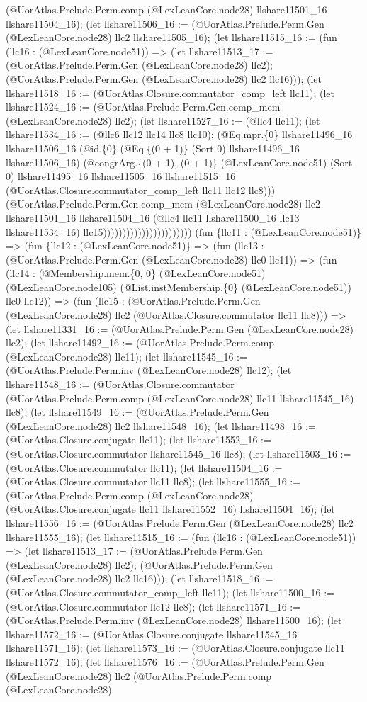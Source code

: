 \documentclass[11pt]{article}
\begin{document}
(@UorAtlas.Prelude.Perm.comp (@LexLeanCore.node28) llshare11501\_16 llshare11504\_16); (let llshare11506\_16 := (@UorAtlas.Prelude.Perm.Gen (@LexLeanCore.node28) llc2 llshare11505\_16); (let llshare11515\_16 := (fun (llc16 : (@LexLeanCore.node51)) => (let llshare11513\_17 := (@UorAtlas.Prelude.Perm.Gen (@LexLeanCore.node28) llc2); (@UorAtlas.Prelude.Perm.Gen (@LexLeanCore.node28) llc2 llc16))); (let llshare11518\_16 := (@UorAtlas.Closure.commutator\_comp\_left llc11); (let llshare11524\_16 := (@UorAtlas.Prelude.Perm.Gen.comp\_mem (@LexLeanCore.node28) llc2); (let llshare11527\_16 := (@llc4 llc11); (let llshare11534\_16 := (@llc6 llc12 llc14 llc8 llc10); (@Eq.mpr.\{0\} llshare11496\_16 llshare11506\_16 (@id.\{0\} (@Eq.\{(0 + 1)\} (Sort 0) llshare11496\_16 llshare11506\_16) (@congrArg.\{(0 + 1), (0 + 1)\} (@LexLeanCore.node51) (Sort 0) llshare11495\_16 llshare11505\_16 llshare11515\_16 (@UorAtlas.Closure.commutator\_comp\_left llc11 llc12 llc8))) (@UorAtlas.Prelude.Perm.Gen.comp\_mem (@LexLeanCore.node28) llc2 llshare11501\_16 llshare11504\_16 (@llc4 llc11 llshare11500\_16 llc13 llshare11534\_16) llc15))))))))))))))))))))))) (fun \{llc11 : (@LexLeanCore.node51)\} => (fun \{llc12 : (@LexLeanCore.node51)\} => (fun (llc13 : (@UorAtlas.Prelude.Perm.Gen (@LexLeanCore.node28) llc0 llc11)) => (fun (llc14 : (@Membership.mem.\{0, 0\} (@LexLeanCore.node51) (@LexLeanCore.node105) (@List.instMembership.\{0\} (@LexLeanCore.node51)) llc0 llc12)) => (fun (llc15 : (@UorAtlas.Prelude.Perm.Gen (@LexLeanCore.node28) llc2 (@UorAtlas.Closure.commutator llc11 llc8))) => (let llshare11331\_16 := (@UorAtlas.Prelude.Perm.Gen (@LexLeanCore.node28) llc2); (let llshare11492\_16 := (@UorAtlas.Prelude.Perm.comp (@LexLeanCore.node28) llc11); (let llshare11545\_16 := (@UorAtlas.Prelude.Perm.inv (@LexLeanCore.node28) llc12); (let llshare11548\_16 := (@UorAtlas.Closure.commutator (@UorAtlas.Prelude.Perm.comp (@LexLeanCore.node28) llc11 llshare11545\_16) llc8); (let llshare11549\_16 := (@UorAtlas.Prelude.Perm.Gen (@LexLeanCore.node28) llc2 llshare11548\_16); (let llshare11498\_16 := (@UorAtlas.Closure.conjugate llc11); (let llshare11552\_16 := (@UorAtlas.Closure.commutator llshare11545\_16 llc8); (let llshare11503\_16 := (@UorAtlas.Closure.commutator llc11); (let llshare11504\_16 := (@UorAtlas.Closure.commutator llc11 llc8); (let llshare11555\_16 := (@UorAtlas.Prelude.Perm.comp (@LexLeanCore.node28) (@UorAtlas.Closure.conjugate llc11 llshare11552\_16) llshare11504\_16); (let llshare11556\_16 := (@UorAtlas.Prelude.Perm.Gen (@LexLeanCore.node28) llc2 llshare11555\_16); (let llshare11515\_16 := (fun (llc16 : (@LexLeanCore.node51)) => (let llshare11513\_17 := (@UorAtlas.Prelude.Perm.Gen (@LexLeanCore.node28) llc2); (@UorAtlas.Prelude.Perm.Gen (@LexLeanCore.node28) llc2 llc16))); (let llshare11518\_16 := (@UorAtlas.Closure.commutator\_comp\_left llc11); (let llshare11500\_16 := (@UorAtlas.Closure.commutator llc12 llc8); (let llshare11571\_16 := (@UorAtlas.Prelude.Perm.inv (@LexLeanCore.node28) llshare11500\_16); (let llshare11572\_16 := (@UorAtlas.Closure.conjugate llshare11545\_16 llshare11571\_16); (let llshare11573\_16 := (@UorAtlas.Closure.conjugate llc11 llshare11572\_16); (let llshare11576\_16 := (@UorAtlas.Prelude.Perm.Gen (@LexLeanCore.node28) llc2 (@UorAtlas.Prelude.Perm.comp (@LexLeanCore.node28) 
\end{document}
